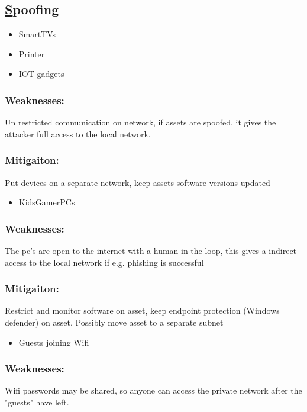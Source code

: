 \documentclass[
	letterpaper, %
	10pt, %
	unnumberedsections, %
	twoside, %
]{APAAssignment}
\begin{document}
\begin{singlespace}
\subsection{\underline{S}poofing}

\begin{itemize}
	\item SmartTVs
	\item Printer 
	\item IOT gadgets 
\end{itemize}

\subsubsection{Weaknesses:} Un restricted communication on network, if assets are spoofed, it gives the attacker full access to the local network.
\subsubsection{Mitigaiton:} Put devices on a separate network, keep assets software versions updated

\begin{itemize}
	\item KidsGamerPCs
\end{itemize}

\subsubsection{Weaknesses:} The pc's are open to the internet with a human in the loop, this gives a indirect access to the local network if e.g. phishing is successful
\subsubsection{Mitigaiton:} Restrict and monitor software on asset, keep endpoint protection (Windows defender) on asset. Possibly move asset to a separate subnet

\begin{itemize}
	\item Guests joining Wifi
\end{itemize}

\subsubsection{Weaknesses:} Wifi passwords may be shared, so anyone can access the private network after the "guests" have left.

\end{singlespace}
\end{document}
